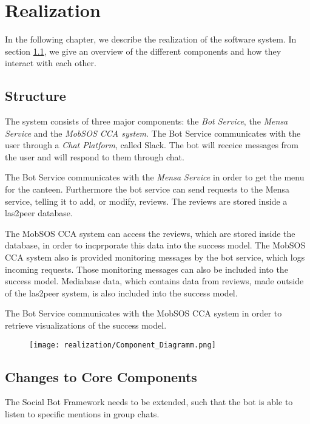 \chapter{Realization}

In the following chapter, we describe the realization of the software system. In section \ref{sec:structure}, we give an overview of the different components and how they interact with each other.

\section{Structure}\label{sec:structure}

The system consists of three major components: the \emph{Bot Service}, the \emph{Mensa Service} and the \emph{MobSOS CCA system}. The Bot Service communicates with the user through a \emph{Chat Platform}, called Slack. The bot will receice messages from the user and will respond to them through chat.

The Bot Service communicates with the \emph{Mensa Service} in order to get the menu for the canteen. Furthermore the bot service can send requests to the Mensa service, telling it to add, or modify, reviews. The reviews are stored inside a las2peer database.

The MobSOS CCA system can access the reviews, which are stored inside the database, in order to incprporate this data into the success model. The MobSOS CCA system also is provided monitoring messages by the bot service, which logs incoming requests. Those monitoring messages can also be included into the success model. Mediabase data, which contains data from reviews, made outside of the las2peer system, is also included into the success model.

The Bot Service communicates with the MobSOS CCA system in order to retrieve visualizations of the success model.
\begin{figure}[h!]
    \centering
    \texttt{[image: realization/Component\_Diagramm.png]}
\end{figure}

\section{Changes to Core Components}

The Social Bot Framework needs to be extended, such that the bot is able to listen to specific mentions in group chats.
